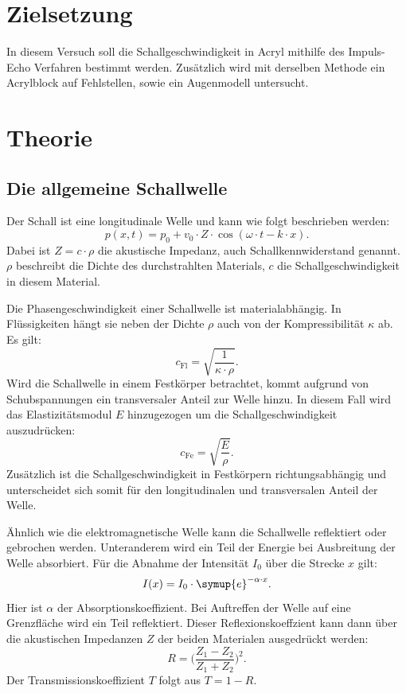 \section{Zielsetzung}
\label{sec:Zielsetzung}
In diesem Versuch soll die Schallgeschwindigkeit in Acryl mithilfe des Impuls-Echo Verfahren bestimmt werden.
Zusätzlich wird mit derselben Methode ein Acrylblock auf Fehlstellen, sowie ein Augenmodell untersucht.

\section{Theorie}
\label{sec:Theorie}

\subsection{Die allgemeine Schallwelle}
\label{Schallwelle}

Der Schall ist eine longitudinale Welle und kann wie folgt beschrieben werden:
\begin{equation*}
    p(x, t) = p_0 + v_0 \cdot Z \cdot \cos(\omega \cdot t - k \cdot x).
\end{equation*}
Dabei ist $Z = c \cdot \rho$ die akustische Impedanz, auch Schallkennwiderstand genannt.
$\rho$ beschreibt die Dichte des durchstrahlten Materials, $c$ die Schallgeschwindigkeit in diesem Material.

\noindent
Die Phasengeschwindigkeit einer Schallwelle ist materialabhängig.
In Flüssigkeiten hängt sie neben der Dichte $\rho$ auch von der Kompressibilität $\kappa$ ab.
Es gilt:
\begin{equation*}
    c_\text{Fl} = \sqrt{\frac{1}{\kappa \cdot \rho}}.
\end{equation*}
Wird die Schallwelle in einem Festkörper betrachtet, kommt aufgrund von Schubspannungen ein transversaler Anteil zur Welle hinzu.
In diesem Fall wird das Elastizitätsmodul $E$ hinzugezogen um die Schallgeschwindigkeit auszudrücken:
\begin{equation*}
    c_\text{Fe} = \sqrt{\frac{E}{\rho}}.
\end{equation*}
Zusätzlich ist die Schallgeschwindigkeit in Festkörpern richtungsabhängig und unterscheidet sich somit für den longitudinalen
und transversalen Anteil der Welle.

\noindent
Ähnlich wie die elektromagnetische Welle kann die Schallwelle reflektiert oder gebrochen werden.
Unteranderem wird ein Teil der Energie bei Ausbreitung der Welle absorbiert.
Für die Abnahme der Intensität $I_0$ über die Strecke $x$ gilt:
\begin{equation} \label{eqn:absorptionkoeff}
    I(x) = I_0 \cdot \symup{e}^{-\alpha \cdot x}.
\end{equation}
Hier ist $\alpha$ der Absorptionskoeffizient.
Bei Auftreffen der Welle auf eine Grenzfläche wird ein Teil reflektiert.
Dieser Reflexionskoeffzient kann dann über die akustischen Impedanzen $Z$ der beiden Materialen ausgedrückt werden:
\begin{equation*}
    R = \biggl(\frac{Z_1 - Z_2}{Z_1 + Z_2}\biggr)^2.
\end{equation*}
Der Transmissionskoeffizient $T$ folgt aus $T = 1 - R$.

